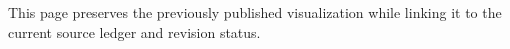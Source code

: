 This page preserves the previously published visualization while linking it to the current source ledger and revision status.
